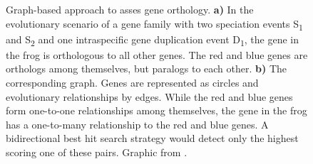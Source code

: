 \begin{figure}[t]
	\centering
	\def\svgwidth{0.8\textwidth}
	
	\caption[Graph-based strategy]{Graph-based approach to asses gene orthology. 
		\textbf{a)} In the evolutionary scenario of a gene family with two speciation
			events S\textsubscript{1} and S\textsubscript{2} and one intraspecific
			gene duplication event D\textsubscript{1}, the gene in the frog is
			orthologous to all other genes. The red and blue genes are orthologs among
			themselves, but paralogs to each other.
		\textbf{b)} The corresponding graph. Genes are represented as circles and
			evolutionary relationships by edges. While the red and blue genes form
			one-to-one relationships among themselves, the gene in the frog has a
			one-to-many relationship to the red and blue genes. A bidirectional best
			hit search strategy would detect only the highest scoring one of these
			pairs. 
		Graphic from \citet{altenhoff2012-1}.
	}
	\label{fig:graph-based-strat}
\end{figure}
